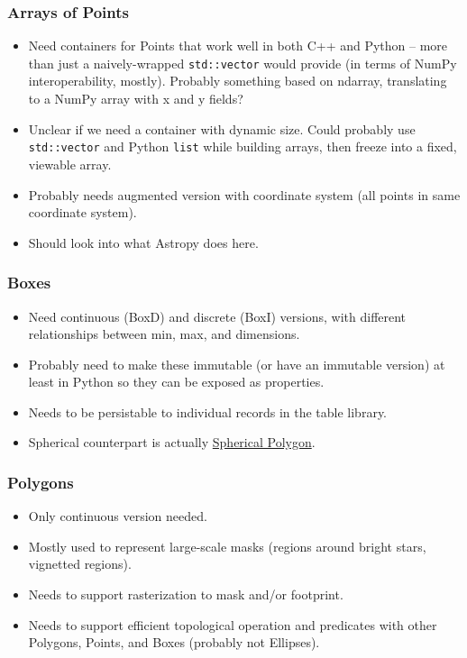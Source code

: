 \subsubsection{Arrays of Points}
\label{sec:spCartesianPointArrays}

\begin{itemize}
\item Need containers for Points that work well in both C++ and Python -- more than just a naively-wrapped \texttt{std::vector} would provide (in terms of NumPy interoperability, mostly).  Probably something based on ndarray, translating to a NumPy array with x and y fields?
\item Unclear if we need a container with dynamic size.  Could probably use \texttt{std::vector} and Python \texttt{list} while building arrays, then freeze into a fixed, viewable array.
\item Probably needs augmented version with coordinate system (all points in same coordinate system).
\item Should look into what Astropy does here.
\end{itemize}

\subsubsection{Boxes}
\label{sec:spCartesianBoxes}

\begin{itemize}
\item Need continuous (BoxD) and discrete (BoxI) versions, with different relationships between min, max, and dimensions.
\item Probably need to make these immutable (or have an immutable version) at least in Python so they can be exposed as properties.
\item Needs to be persistable to individual records in the table library.
\item Spherical counterpart is actually \hyperref[sec:spSphericalPolygons]{Spherical Polygon}.
\end{itemize}

\subsubsection{Polygons}
\label{sec:spCartesianPolygons}

\begin{itemize}
\item Only continuous version needed.
\item Mostly used to represent large-scale masks (regions around bright stars, vignetted regions).
\item Needs to support rasterization to mask and/or footprint.
\item Needs to support efficient topological operation and predicates with other Polygons, Points, and Boxes (probably not Ellipses).
\end{itemize}

